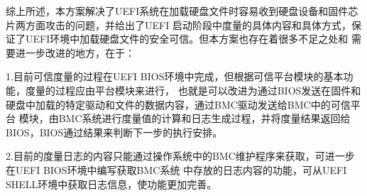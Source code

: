 \begin{APP}
\par 综上所述，本方案解决了UEFI系统在加载硬盘文件时容易收到硬盘设备和固件芯片两方面攻击的问题，并给出了UEFI
启动阶段中度量的具体内容和具体方式，保证了UEFI环境中加载硬盘文件的安全可信。但本方案也存在着很多不足之处和
需要进一步改进的地方，在于：
\par 1.目前可信度量的过程在UEFI BIOS环境中完成，但根据可信平台模块的基本功能，度量的过程应由平台模块来进行，
也就是可以改进为通过BIOS发送在固件和硬盘中加载的特定驱动和文件的数据内容，通过BMC驱动发送给BMC中的可信平台
模块，由BMC系统进行度量值的计算和日志生成过程，并将度量结果返回给BIOS，BIOS通过结果来判断下一步的执行安排。
\par 2.目前的度量日志的内容只能通过操作系统中的BMC维护程序来获取，可进一步在UEFI BIOS环境中编写获取BMC系统
中存放的日志内容的功能，可从UEFI SHELL环境中获取日志信息，使功能更加完善。

\end{APP}


